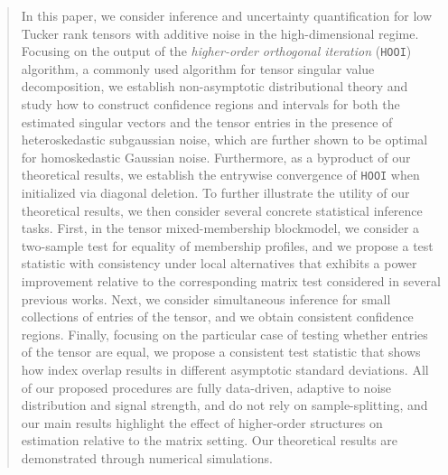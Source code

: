\documentclass[10pt]{article}
\newcommand{\0}{{\mathbf{0}}}
\newcommand{\1}{{\mathbf{1}}}
\begin{document}
\begin{abstract}
In this paper, we consider inference and uncertainty quantification for low Tucker rank tensors with additive noise in the high-dimensional regime. Focusing on the output of the \emph{higher-order orthogonal iteration} (\texttt{HOOI}) algorithm,  a commonly used algorithm for tensor singular value decomposition, we establish non-asymptotic distributional theory and study how to construct confidence regions and intervals for both the estimated singular vectors and the tensor entries in the presence of heteroskedastic subgaussian noise, which are further shown to be optimal for homoskedastic  Gaussian noise. Furthermore, as a byproduct of our theoretical results, we establish the entrywise convergence of \texttt{HOOI} when initialized via diagonal deletion. To further illustrate the utility of our theoretical results, we then consider several concrete statistical inference tasks.  First, in the tensor mixed-membership blockmodel, we consider a two-sample test for equality of membership profiles, and we propose a test statistic with consistency under local alternatives that exhibits a power improvement relative to the corresponding matrix test considered in several previous works. Next, we consider simultaneous inference for small collections of entries of the tensor, and we obtain consistent confidence regions.   Finally, focusing on the particular case of testing whether entries of the tensor are equal, we propose a consistent test statistic that shows how index overlap results in different asymptotic standard deviations. All of our  proposed procedures are fully data-driven, adaptive to noise distribution and signal strength, and do not rely on sample-splitting, and our main results highlight the effect of higher-order structures on estimation relative to the matrix setting. Our theoretical results are demonstrated through numerical simulations.  
\end{abstract}



\end{document}
